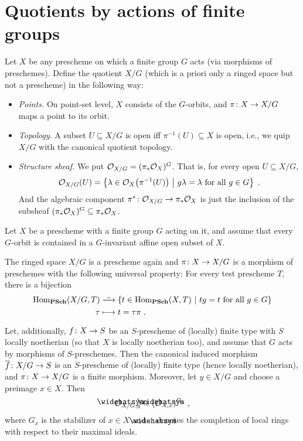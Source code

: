 \documentclass[a4paper,parskip=half,numbers=enddot, DIV=12]{scrreprt}
\begin{document}
\section{Quotients by actions of finite groups}
Let $X$ be any prescheme on which a finite group $G$ acts (via morphisms of preschemes). Define the quotient $X/G$ (which is a priori only a ringed space but not a prescheme) in the following way: 
\begin{itemize}
	\item \emph{Points.} On point-set level, $X$ consists of the $G$-orbits, and $\pi\colon X\morphism X/G$ maps a point to its orbit.
	\item \emph{Topology}. A subset $U\subseteq X/G$ is open iff $\pi^{-1}(U)\subseteq X$ is open, i.e., we quip $X/G$ with the canonical quotient topology.
	\item \emph{Structure sheaf.} We put $\mathcal{O}_{X/G}=(\pi_*\mathcal{O}_X)^G$. That is, for every open $U\subseteq X/G$,
	\begin{align*}
		\mathcal{O}_{X/G}(U)=\left\{\lambda\in\mathcal{O}_X\big(\pi^{-1}(U)\big)\ \middle|\  g\lambda=\lambda\text{ for all }g\in G\right\}\;.
	\end{align*}
	And the algebraic component $\pi^*\colon \Oo_{X/G}\morphism \pi_*\Oo_X$ is just the inclusion of the subsheaf $(\pi_*\mathcal{O}_X)^G\subseteq\pi_*\mathcal{O}_X$.
\end{itemize}
\begin{thm}
	Let $X$ be a prescheme with a finite group $G$ acting on it, and assume that every $G$-orbit is contained in a $G$-invariant affine open subset of $X$.
	\begin{alphanumerate}
		\item The ringed space $X/G$ is a prescheme again and $\pi\colon X\morphism X/G$ is a morphism of preschemes with the following universal property: For every test prescheme $T$, there is a bijection
		\begin{align*}
			\Hom_{\cat{PSch}}(X/G,T)&\isomorphism \left\{t\in\Hom_{\cat{PSch}}(X,T)\st tg=t\text{ for all }g\in G\right\}\\
			\tau&\longmapsto t=\tau\pi\;.
		\end{align*}
		\item Let, additionally, $f\colon X\morphism S$ be an $S$-prescheme of (locally) finite type with $S$ locally noetherian (so that $X$ is locally noetherian too), and assume that $G$ acts by morphisms of $S$-preschemes. Then the canonical induced morphism $\ov{f}\colon X/G\morphism S$ is an $S$-prescheme of (locally) finite type (hence locally noetherian), and $\pi\colon X\morphism X/G$ is a finite morphism. Moreover, let $y\in X/G$ and choose a preimage $x\in X$. Then
		\begin{align*}
			\roof{\Oo}_{X/G,y}\cong (\roof{\Oo}_{X,x})^{G_x}\;,
		\end{align*}
		where $G_x$ is the stabilizer of $x\in X$ and $\roof{\phantom{x}}$ denotes the completion of local rings with respect to their maximal ideals.
	\end{alphanumerate}
\end{thm}
\end{document}
